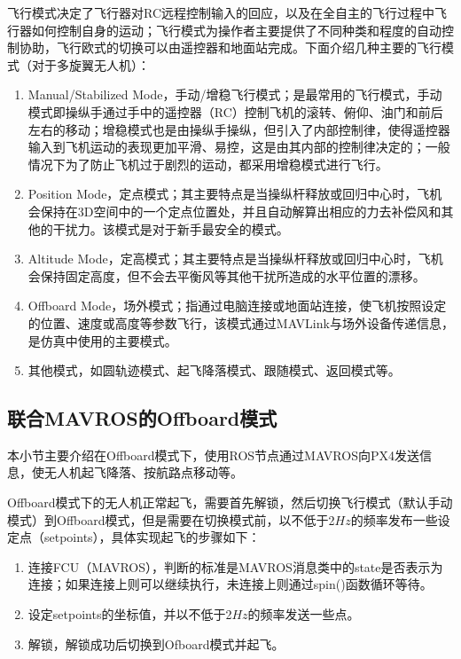 飞行模式决定了飞行器对RC远程控制输入的回应，以及在全自主的飞行过程中飞行器如何控制自身的运动；飞行模式为操作者主要提供了不同种类和程度的自动控制协助，飞行欧式的切换可以由遥控器和地面站完成。下面介绍几种主要的飞行模式（对于多旋翼无人机）：
\begin{enumerate}
	\item 
	Manual/Stabilized Mode，手动/增稳飞行模式；是最常用的飞行模式，手动模式即操纵手通过手中的遥控器（RC）控制飞机的滚转、俯仰、油门和前后左右的移动；增稳模式也是由操纵手操纵，但引入了内部控制律，使得遥控器输入到飞机运动的表现更加平滑、易控，这是由其内部的控制律决定的；一般情况下为了防止飞机过于剧烈的运动，都采用增稳模式进行飞行。
	\item 
	Position Mode，定点模式；其主要特点是当操纵杆释放或回归中心时，飞机会保持在3D空间中的一个定点位置处，并且自动解算出相应的力去补偿风和其他的干扰力。该模式是对于新手最安全的模式。
	\item
	Altitude Mode，定高模式；其主要特点是当操纵杆释放或回归中心时，飞机会保持固定高度，但不会去平衡风等其他干扰所造成的水平位置的漂移。
	\item 
	Offboard Mode，场外模式；指通过电脑连接或地面站连接，使飞机按照设定的位置、速度或高度等参数飞行，该模式通过MAVLink与场外设备传递信息，是仿真中使用的主要模式。
	\item 
	其他模式，如圆轨迹模式、起飞降落模式、跟随模式、返回模式等。
\end{enumerate}

\subsection{联合MAVROS的Offboard模式} \label{2.2.3}
本小节主要介绍在Offboard模式下，使用ROS节点通过MAVROS向PX4发送信息，使无人机起飞降落、按航路点移动等。

Offboard模式下的无人机正常起飞，需要首先解锁，然后切换飞行模式（默认手动模式）到Offboard模式，但是需要在切换模式前，以不低于2$Hz$的频率发布一些设定点（setpoints），具体实现起飞的步骤如下：

\begin{enumerate}
	\item 
	连接FCU（MAVROS），判断的标准是MAVROS消息类中的state是否表示为连接；如果连接上则可以继续执行，未连接上则通过spin()函数循环等待。
	\item 
	设定setpoints的坐标值，并以不低于2$Hz$的频率发送一些点。
	\item 
	解锁，解锁成功后切换到Ofboard模式并起飞。
\end{enumerate}

